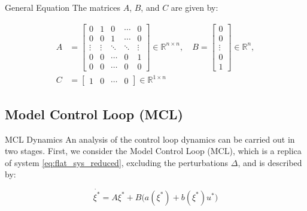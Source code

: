 \begin{frame}{General Equation}
The matrices \( A \), \( B \), and \( C \) are given by:

\begin{align*}
A &=
\begin{bmatrix}
0 & 1 & 0 & \cdots & 0 \\
0 & 0 & 1 & \cdots & 0 \\
\vdots & \vdots & \ddots & \ddots & \vdots \\
0 & 0 & \cdots & 0 & 1 \\
0 & 0 & \cdots & 0 & 0
\end{bmatrix}
\in \mathbb{R}^{n \times n}, \quad
B =
\begin{bmatrix}
0 \\
0 \\
\vdots \\
0 \\
1
\end{bmatrix}
\in \mathbb{R}^n, \\
C &=
\begin{bmatrix}
1 & 0 & \cdots & 0
\end{bmatrix}
\in \mathbb{R}^{1 \times n}
\end{align*}
\end{frame}


\subsection{Model Control Loop (MCL)}
\begin{frame}{MCL Dynamics}
    An analysis of the control loop dynamics can be carried out in two stages. First, we consider the Model Control Loop (MCL), which is a replica of system \ref{eq:flat_sys_reduced}, excluding the perturbations \(\Delta\), and is described by:

\begin{equation}
\label{eq:MCL_open_loop}
  \dot{\xi^*} = A\xi^* + B\big(a(\xi^*) + b(\xi^*)u^* \big)
\end{equation}

\end{frame}

